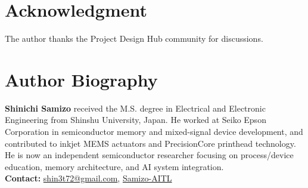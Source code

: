 \documentclass[conference]{IEEEtran}
\begin{document}
\section*{Acknowledgment}
The author thanks the Project Design Hub community for discussions.




\section*{Author Biography}
\noindent\textbf{Shinichi Samizo}
received the M.S. degree in Electrical and Electronic Engineering from Shinshu University, Japan.  
He worked at Seiko Epson Corporation in semiconductor memory and mixed-signal device development, and contributed to inkjet MEMS actuators and PrecisionCore printhead technology.  
He is now an independent semiconductor researcher focusing on process/device education, memory architecture, and AI system integration.\\[2pt]
\textbf{Contact:} \href{mailto:shin3t72@gmail.com}{shin3t72@gmail.com}, 
\href{https://github.com/Samizo-AITL}{Samizo-AITL}
\end{document}
